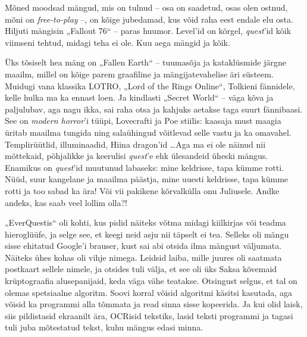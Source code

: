 Mõned moodsad mängud, mis on tulnud -- osa on saadetud, osas olen ostnud, 
mõni on \emph{free-to-play} --, on kõige jubedamad, kus võid raha eest 
endale elu osta. Hiljuti mängisin „Fallout 76“ -- paras huumor. 
Level'id on kõrgel, \emph{quest}'id kõik viimseni tehtud, midagi teha ei 
ole. Kuu aega mängid ja kõik. 

Üks tõsiselt hea mäng on „Fallen Earth“ -- 
tuumasõja ja kataklüsmide järgne maailm, millel on
kõige parem graafiline ja mängijatevahelise äri süsteem. Muidugi 
vana klassika LOTRO, „Lord of the Rings Online“, Tolkieni fännidele, kelle hulka 
ma ka ennast loen. Ja kindlasti „Secret World“ -- väga kõva ja paljulubav, 
aga nagu ikka, sai raha otsa ja kahjuks aetakse taga suurt fännibaasi. See on \emph{modern horror}'i tüüpi, Lovecrafti 
ja Poe stiilis: kaasaja must maagia üritab maailma 
tungida ning salaühingud võitlevad selle vastu ja ka omavahel. Templirüütlid, 
illuminaadid, Hiina dragon'id \ldots Aga ma ei ole näinud nii mõttekaid, 
põhjalikke ja keerulisi \emph{quest}'e ehk ülesandeid üheski mängus. Enamikus on 
\emph{quest}'id muutunud labaseks: mine 
keldrisse, tapa kümme rotti. Nüüd, suur kangelane ja maailma päästja, mine uuesti 
keldrisse, tapa kümme rotti ja too sabad ka ära! Või vii pakikene kõrvalkülla onu 
Juliusele. Andke andeks, kas saab veel lollim olla?!

„EverQuestis“ oli kohti, kus pidid näiteks võtma midagi kiilkirjas või 
teadma hieroglüüfe, ja selge see, et keegi neid asju nii täpselt ei tea. 
Selleks oli mängu sisse ehitatud Google'i brauser, kust sai abi otsida ilma mängust väljumata. Näiteks ühes kohas oli vihje 
nimega. Leidsid laiba, mille juures oli saatmata postkaart sellele nimele, ja 
otsides tuli välja, et see oli üks Saksa kõvemaid krüptograafia 
alusepanijaid, keda väga vähe teatakse. Otsingust selgus, et tal on olemas 
spetsiaalne algoritm. Soovi korral võisid algoritmi käsitsi kasutada, aga 
võisid ka programmi alla tõmmata ja read sinna sisse kopeerida. Ja kui olid laisk, siis pildistasid ekraanilt ära, OCRisid tekstiks, lasid teksti 
programmi ja tagasi tuli juba mõtestatud tekst, kuhu mängus edasi minna.